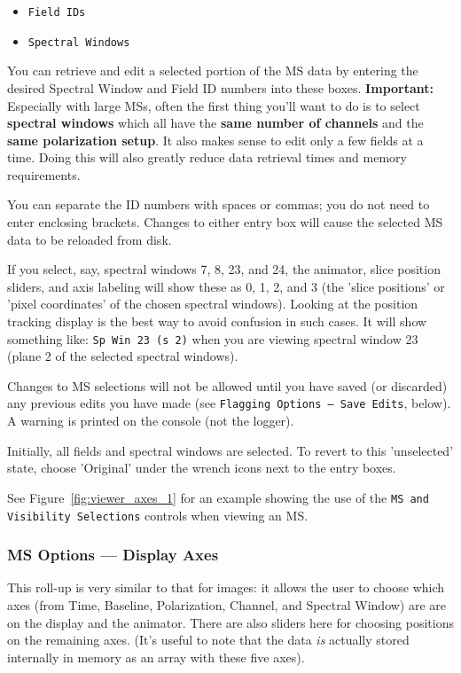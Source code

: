 \begin{itemize}

\item {\tt Field IDs}

\item {\tt Spectral Windows}

\end{itemize}

You can retrieve and edit a selected portion of the MS data
by entering the desired Spectral Window and Field ID numbers into
these boxes.  {\bf Important:} Especially with large MSs, often the
first thing you'll want to do is to select {\bf spectral windows}
which all have the {\bf same number of channels} and the
{\bf same polarization setup}.  It also makes sense to edit only
a few fields at a time.   Doing this will also
greatly reduce data retrieval times and memory requirements.

You can separate the ID numbers with spaces or commas; you do not need to
enter enclosing brackets.  Changes to either entry box will cause
the selected MS data to be reloaded from disk.

If you select, say, spectral windows 7, 8, 23, and 24, the animator, slice
position sliders, and axis labeling will show 
these as 0, 1, 2, and 3 (the 'slice positions' or 'pixel coordinates' of the
chosen spectral windows).  Looking at the position tracking display is the best
way to avoid confusion in such cases.  It will show something like: 
{\tt Sp Win 23 (s 2)} when you are viewing spectral window 23 (plane 2
of the selected spectral windows).

Changes to MS selections will not be allowed until you have saved
(or discarded) any previous edits you have made (see {\tt Flagging Options 
-- Save Edits}, below).  A warning is printed on the console (not the logger).

Initially, all fields and spectral windows are selected.  To revert to
this 'unselected' state, choose 'Original' under the wrench
icons next to the entry boxes.

See Figure~\ref{fig:viewer_axes_1} for an example showing the use
of the {\tt MS and Visibility Selections} controls when 
viewing an MS.

\subsubsection{MS Options --- Display Axes}
\label{section:display.ms.adjust.axes}

This roll-up is very similar to that for images: it allows the user to
choose which axes (from Time, Baseline, Polarization, Channel, and
Spectral Window) are are on the display and the animator.  There are
also sliders here for choosing positions on the remaining axes.  (It's 
useful to note that the data {\it is} actually stored internally in
memory as an array with these five axes).

